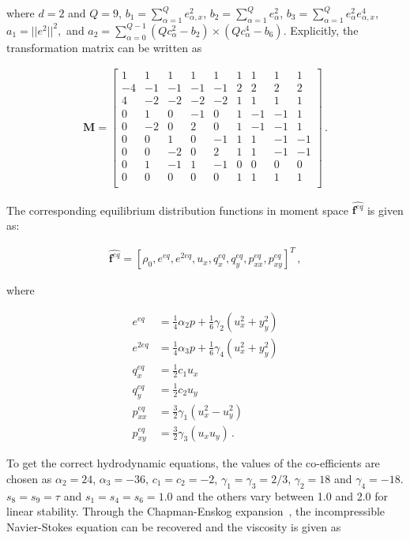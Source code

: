 \noindent where $d = 2$ and $Q = 9$, $b_1=\sum_{\alpha=1}^{Q}e_{\alpha,x}^2$, 
$b_2=\sum_{\alpha=1}^{Q}e_{\alpha}^2$, 
$b_3=\sum_{\alpha=1}^{Q}e_{\alpha}^2e_{\alpha,x}^4$, $a_1=||e^2||^2,$ and 
$a_2=\sum_{\alpha=0}^{Q-1}(Qc_{\alpha}^2-b_2)\times(Qc_{\alpha}^4-b_6)$. 
Explicitly, the transformation matrix can be written as

\begin{align}
\mathbf{M}= \begin{bmatrix}
 1 &  1 &  1 &  1 &  1 &  1 &  1 &  1 &  1 \\
-4 & -1 & -1 & -1 & -1 &  2 &  2 &  2 &  2 \\ 
 4 & -2 & -2 & -2 & -2 &  1 &  1 &  1 &  1 \\
 0 &  1 &  0 & -1 &  0 &  1 & -1 & -1 &  1 \\
 0 & -2 &  0 &  2 &  0 &  1 & -1 & -1 &  1 \\
 0 &  0 &  1 &  0 & -1 &  1 &  1 & -1 & -1 \\
 0 &  0 & -2 &  0 &  2 &  1 &  1 & -1 & -1 \\
 0 &  1 & -1 &  1 & -1 &  0 &  0 &  0 &  0 \\
 0 &  0 &  0 &  0 &  0 &  1 &  1 &  1 &  1 \\
\end{bmatrix}\,.
\end{align}

The corresponding equilibrium distribution functions in moment space 
$\widehat{\mathbf{f}^{eq}}$ is given as:

\begin{align}
\widehat{\mathbf{f}^{eq}}=\left[\rho_0,e^{eq}, 
e^{2eq},u_x,q_x^{eq},q_y^{eq},p_{xx}^{eq},p_{xy}^{eq}\right]^T\,,
\end{align}

\noindent where

\begin{align}
e^{eq} & = \frac{1}{4}\alpha_2p+\frac{1}{6}\gamma_2(u_x^2+y_y^2)\\
e^{2eq} & = \frac{1}{4}\alpha_3p+\frac{1}{6}\gamma_4(u_x^2+y_y^2)\\
q_x^{eq} & = \frac{1}{2}c_1u_x\\
q_y^{eq} & = \frac{1}{2}c_2u_y \\
p_{xx}^{eq} & = \frac{3}{2}\gamma_1(u_x^2 - u_y^2)\\
p_{xy}^{eq} & = \frac{3}{2}\gamma_3(u_xu_y) \,.
\end{align}

To get the correct hydrodynamic equations, the values of the co-efficients are 
chosen as $\alpha_2=24$,  $\alpha_3=-36$, $c_1=c_2=-2$, 
$\gamma_1=\gamma_3=2/3$, $\gamma_2=18$ and $\gamma_4=-18$. $s_8 = s_9 = \tau$ 
and $s_1=s_4=s_6=1.0$ and the others vary between 1.0 and 2.0 for linear 
stability. Through the Chapman-Enskog expansion~\citep{Du2006}, the 
incompressible Navier-Stokes equation can be recovered and the viscosity is 
given as

